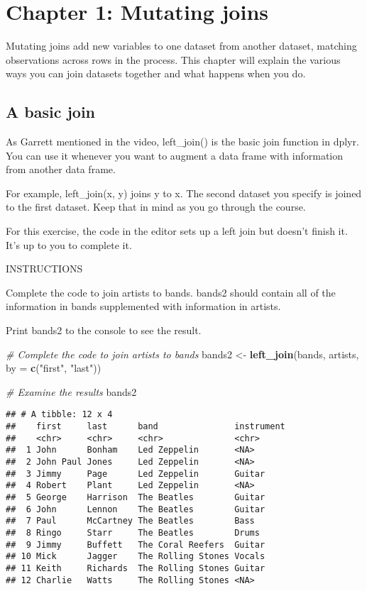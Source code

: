 \documentclass[]{article}
\newenvironment{Shaded}{\begin{snugshade}}{\end{snugshade}}
\newcommand{\KeywordTok}[1]{\textcolor[rgb]{0.13,0.29,0.53}{\textbf{#1}}}
\newcommand{\DataTypeTok}[1]{\textcolor[rgb]{0.13,0.29,0.53}{#1}}
\newcommand{\StringTok}[1]{\textcolor[rgb]{0.31,0.60,0.02}{#1}}
\newcommand{\CommentTok}[1]{\textcolor[rgb]{0.56,0.35,0.01}{\textit{#1}}}
\newcommand{\NormalTok}[1]{#1}
\begin{document}
\section{Chapter 1: Mutating joins}\label{chapter-1-mutating-joins}

Mutating joins add new variables to one dataset from another dataset,
matching observations across rows in the process. This chapter will
explain the various ways you can join datasets together and what happens
when you do.

\subsection{A basic join}\label{a-basic-join}

As Garrett mentioned in the video, left\_join() is the basic join
function in dplyr. You can use it whenever you want to augment a data
frame with information from another data frame.

For example, left\_join(x, y) joins y to x. The second dataset you
specify is joined to the first dataset. Keep that in mind as you go
through the course.

For this exercise, the code in the editor sets up a left join but
doesn't finish it. It's up to you to complete it.

INSTRUCTIONS

Complete the code to join artists to bands. bands2 should contain all of
the information in bands supplemented with information in artists.

Print bands2 to the console to see the result.

\begin{Shaded}
\begin{Highlighting}[]
\CommentTok{# Complete the code to join artists to bands}
\NormalTok{bands2 <-}\StringTok{ }\KeywordTok{left_join}\NormalTok{(bands, artists, }\DataTypeTok{by =} \KeywordTok{c}\NormalTok{(}\StringTok{"first"}\NormalTok{, }\StringTok{"last"}\NormalTok{))}

\CommentTok{# Examine the results}
\NormalTok{bands2}
\end{Highlighting}
\end{Shaded}

\begin{verbatim}
## # A tibble: 12 x 4
##    first     last      band               instrument
##    <chr>     <chr>     <chr>              <chr>     
##  1 John      Bonham    Led Zeppelin       <NA>      
##  2 John Paul Jones     Led Zeppelin       <NA>      
##  3 Jimmy     Page      Led Zeppelin       Guitar    
##  4 Robert    Plant     Led Zeppelin       <NA>      
##  5 George    Harrison  The Beatles        Guitar    
##  6 John      Lennon    The Beatles        Guitar    
##  7 Paul      McCartney The Beatles        Bass      
##  8 Ringo     Starr     The Beatles        Drums     
##  9 Jimmy     Buffett   The Coral Reefers  Guitar    
## 10 Mick      Jagger    The Rolling Stones Vocals    
## 11 Keith     Richards  The Rolling Stones Guitar    
## 12 Charlie   Watts     The Rolling Stones <NA>
\end{verbatim}
\end{document}
